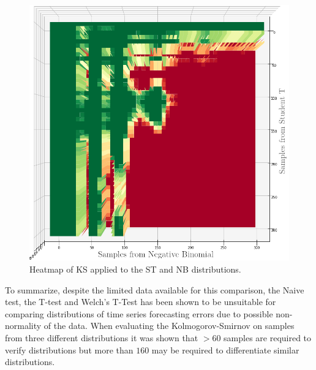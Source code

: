 \begin{figure}[h]
    \centering
    \includegraphics[width=\linewidth]{./img/hypothesis_test/deepar_heatmap_Y_student_t_X_neg_bin_ks_edited.png}
    \caption{Heatmap of KS applied to the ST and NB distributions.}
    \label{ks_student_t_neg_bin}
    \endminipage
\end{figure}

To summarize, despite the limited data available for this comparison, the Naive test, the T-test and Welch’s T-Test has been shown to be unsuitable for comparing distributions of time series forecasting errors due to possible non-normality of the data. When evaluating the Kolmogorov-Smirnov on samples from three different distributions it was shown that \(>60\) samples are required to verify distributions but more than \(160\) may be required to differentiate similar distributions.

